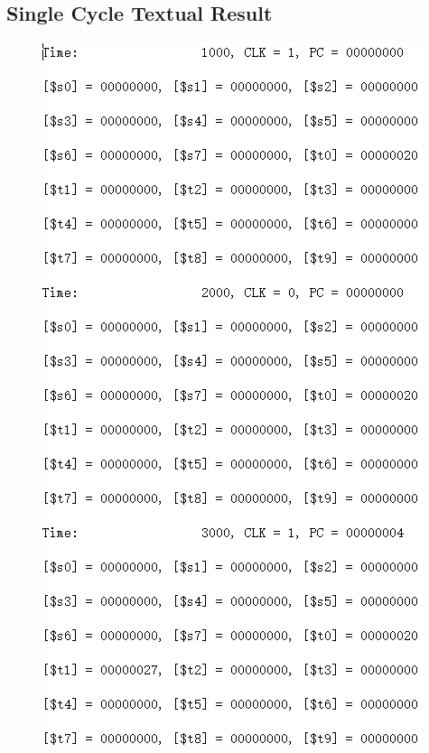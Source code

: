 \documentclass[12pt]{article}
\begin{document}
\subsection{Single Cycle Textual Result}
\begin{figure}[H]
\centering
\includegraphics[scale=1]{R1.jpg}
\end{figure}
\end{document}
